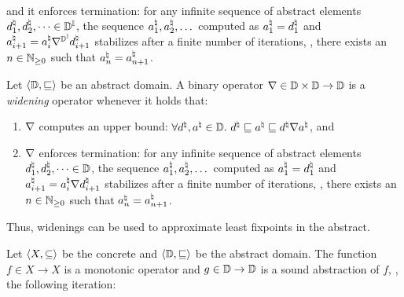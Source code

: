 \begin{description}
\begin{align*}
  \end{align*}
  and it enforces termination: for any infinite sequence of abstract elements $d^\natural_1, d^\natural_2, \dots \in \mathbb{D}^{\mathbb{I}}$, the sequence $a^\natural_1, a^\natural_2, \dots$ computed as $a^\natural_1 = d^\natural_1$ and $a^\natural_{i+1} = a^\natural_i \nabla^{\mathbb{D}^{\mathbb{I}}} d^\natural_{i+1}$ stabilizes after a finite number of iterations, \ie, there exists an $n \in \mathbb{N}_{\ge0}$ such that $a^\natural_n = a^\natural_{n+1}$.
  \begin{definition}[Widening]
    Let $\langle \mathbb{D}, \sqsubseteq \rangle$ be an abstract domain.
    A binary operator $\nabla\in\mathbb{D}\times\mathbb{D}\to\mathbb{D}$ is a \emph{widening} operator whenever it holds that:
    \begin{enumerate}
      \item $\nabla$ computes an upper bound:
      $\forall d^\natural, a^\natural \in \mathbb{D}.~ d^\natural \sqsubseteq a^\natural \sqsubseteq d^\natural \nabla a^\natural$, and
      \item $\nabla$ enforces termination: for any infinite sequence of abstract elements $d^\natural_1, d^\natural_2, \dots \in \mathbb{D}$, the sequence $a^\natural_1, a^\natural_2, \dots$ computed as $a^\natural_1 = d^\natural_1$ and $a^\natural_{i+1} = a^\natural_i \nabla d^\natural_{i+1}$ stabilizes after a finite number of iterations, \ie, there exists an $n \in \mathbb{N}_{\ge0}$ such that $a^\natural_n = a^\natural_{n+1}$.
    \end{enumerate}
  \end{definition}
  Thus, widenings can be used to approximate least fixpoints in the abstract.
  \newpage
  \begin{theorem}
    Let $\langle X, \subseteq \rangle$ be the concrete and $\langle \mathbb{D}, \sqsubseteq \rangle$ be the abstract domain.
    The function $f \in X \to X$ is a monotonic operator and $g \in \mathbb{D} \to \mathbb{D}$ is a sound abstraction of $f$, \cf{} , the following iteration:
    \begin{align*}

\end{align*}
\end{theorem}
\end{description}
